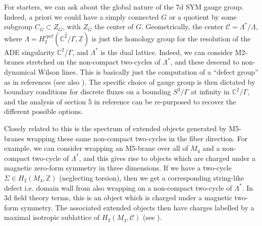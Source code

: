 \documentclass[12pt]{article}%
\numberwithin{equation}{section}
\renewcommand{\(}{\left(}
\renewcommand{\)}{\right)}
\renewcommand{\[}{\left[}
\renewcommand{\]}{\right]}
\begin{document}
For starters, we can ask about the global nature of the 7d SYM gauge group. Indeed, a priori
we could have a simply connected $G$ or a quotient by some subgroup $C_G \subset Z_G$,
with $Z_G$ the center of $G$. Geometrically, the center $\mathcal{C} = \Lambda^{\ast} / \Lambda$,
where $\Lambda = H_{2}^{cpct}(\widetilde{\mathbb{C}^{2}/\Gamma},\mathbb{Z})$ is just the
homology group for the resolution of the ADE singularity $\mathbb{C}^2 / \Gamma$, and $\Lambda^{\ast}$ is the dual lattice.
Indeed, we can consider M2-branes stretched on the non-compact two-cycles
of $\Lambda^{\ast}$, and these descend to non-dynamical Wilson lines.
This is basically just the computation of a ``defect group'' as in references
\cite{Tachikawa:2013hya, DelZotto:2015isa} (see also \cite{Albertini:2020mdx, Cvetic:2021sxm}).
The specific choice of gauge group is then dictated by boundary conditions for discrete fluxes on a bounding $S^3 / \Gamma$ at infinity in $\mathbb{C}^2 / \Gamma$, and the analysis of section 5 in
reference \cite{DelZotto:2015isa} can be re-purposed to recover the different possible options.

Closely related to this is the spectrum of extended objects generated by M5-branes wrapping these same non-compact two-cycles in the fiber direction. For example, we can consider wrapping an M5-brane over all of $M_4$ and a non-compact two-cycle of $\Lambda^{\ast}$, and
this gives rise to objects which are charged under a magnetic zero-form symmetry in three dimensions.
If we have a two-cycle $\Sigma \in H_{2}(M_4, \mathbb{Z})$ (neglecting torsion),
then we get a corresponding string-like defect i.e. domain wall from also wrapping on a non-compact two-cycle of $\Lambda^{\ast}$.
In 3d field theory terms, this is an object which is charged under a magnetic two-form symmetry. The associated extended
objects then have charges labelled by a maximal isotropic sublattice of $H_{2}(M_4 , \mathcal{C})$ (see \cite{DelZotto:2015isa}).
\end{document}
